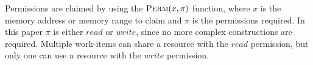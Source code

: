 Permissions are claimed by using the $\textproc{Perm}(x, \pi)$ function, where $x$ is the memory address or memory range to claim and $\pi$ is the permissions required.
In this paper $\pi$ is either $read$ or $write$, since no more complex constructions are required.
Multiple work-items can share a resource with the $read$ permission, but only one can use a resource with the $write$ permission.
